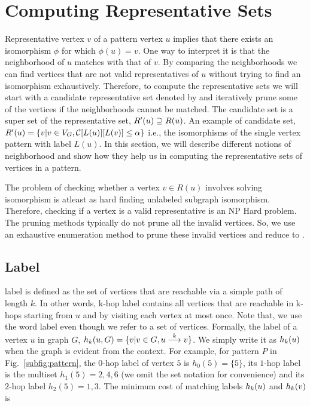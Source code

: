 
\section{Computing Representative Sets} 
\label{sec:representative}
Representative vertex $v$ of a pattern
vertex $u$ implies that there exists an isomorphism $\phi$ for which $\phi(u) =
v$.  One way to interpret it is that the neighborhood of $u$ matches with that
of $v$.  By comparing the neighborhoods we can find vertices that are not valid
representatives of $u$ without trying to find an isomorphism exhaustively.
Therefore, to compute the representative sets we will start with a candidate
representative set denoted by \CR  and iteratively prune some of the vertices if
the neighborhoods cannot be matched.  The candidate set is a super set of the
representative set, $\CR \supseteq \RS$.  An example of candidate set, $ \CR =
\{v| v \in \vg, \labcost{C}{L(u)}{L(v)} \leq \alpha \}$ i.e., the isomorphisms of
the single vertex pattern with label $L(u)$.  In this section, we will describe
different notions of neighborhood and show how they help us in computing the
representative sets of vertices in a pattern.

The problem of checking whether a vertex $v \in R(u)$ involves solving
isomorphism is atleast as hard finding unlabeled subgraph isomorphism.
Therefore, checking if a vertex is a valid representative is an
NP Hard problem. The pruning methods typically do not
prune all the invalid vertices.  So, we use an exhaustive enumeration method to
prune these invalid vertices and reduce \CR to \RS.

 \subsection{\khop Label}
 \label{sec:khop}
 \khop label is defined as the set of vertices that are reachable via a simple
 path of length $k$.  In other words, k-hop label contains all vertices that are
 reachable in k-hops starting from $u$ and by visiting each vertex at most once.
 Note that, we use the word label even though we refer to a set of vertices.
 Formally, the \khop label of a vertex $u$ in graph $G$, $\khopl{k}{u,G} = \{v |
 v \in G, \kpath{u}{v}{k}\}$.  We simply write it as $\khopl{k}{u}$ when the
 graph is evident from the context.  For example, for pattern $P$ in
 Fig.~\ref{subfig:pattern}, the $0$-hop label of vertex $5$ is $h_0(5) = \{5\}$,
 its $1$-hop label is the multiset $h_1(5) = 2, 4, 6$ (we omit the set notation
 for convenience) and its $2$-hop label $h_2(5) = 1, 3$. The minimum cost of
 matching \khop labels $\khopl{k}{u}$ and $\khopl{k}{v}$ is 

